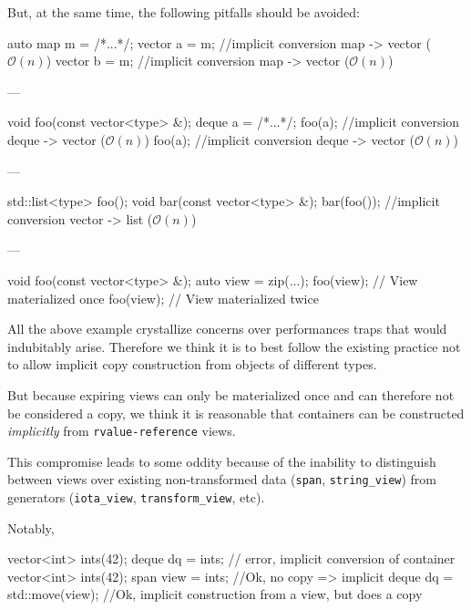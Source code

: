 \documentclass{wg21}
\newcommand{\cc}[1]{\texttt{#1}}
\begin{document}
But, at the same time, the following pitfalls should be avoided:


\begin{codeblock}
    auto map m = /*...*/;
    vector a = m;  //implicit conversion map -> vector ($\mathcal{O}(n)$)
    vector b = m;  //implicit conversion map -> vector ($\mathcal{O}(n)$)
\end{codeblock}
---

\begin{codeblock}
    void foo(const vector<type> &);
    deque a =  /*...*/;
    foo(a);  //implicit conversion deque -> vector ($\mathcal{O}(n)$)
    foo(a);  //implicit conversion deque -> vector ($\mathcal{O}(n)$)
\end{codeblock}
---

\begin{codeblock}
    std::list<type> foo();
    void bar(const vector<type> &);
    bar(foo()); //implicit conversion vector -> list ($\mathcal{O}(n)$)
\end{codeblock}
---

\begin{codeblock}
    void foo(const vector<type> &);
    auto view = zip(...);
    foo(view); // View materialized once
    foo(view); // View materialized twice
\end{codeblock}

All the above example crystallize concerns over performances traps that would indubitably arise.
Therefore we think it is to best follow the existing practice not to allow implicit copy construction from objects of different types.

But because expiring views can only be materialized once and can therefore not be considered a copy, we think it is reasonable that
containers can be constructed \emph{implicitly} from \cc{rvalue-reference} views.

This compromise leads to some oddity because of the inability to distinguish between views over existing
non-transformed data (\cc{span}, \cc{string_view}) from generators (\cc{iota_view}, \cc{transform_view}, etc).

Notably,

\begin{codeblock}
{
    vector<int> ints(42);
    deque dq = ints; // error, implicit conversion of container
}
{
    vector<int> ints(42);
    span view = ints; //Ok, no copy => implicit
    deque dq =  std::move(view);  //Ok, implicit construction from a view, but does a copy
}
\end{codeblock}
\end{document}
